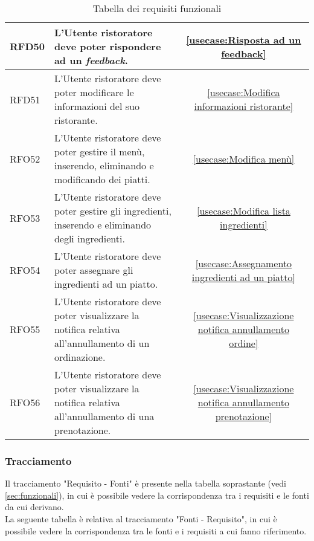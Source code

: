 \begin{table}[H]
\begin{tabularx}{\textwidth}{l|X|c}
		\hline
		RFD50       & L'Utente ristoratore deve poter rispondere ad un \textit{feedback}.                                                              & \autoref{usecase:Risposta ad un feedback}            \\
		\hline
		RFD51       & L'Utente ristoratore deve poter modificare le informazioni del suo ristorante.                                          & \autoref{usecase:Modifica informazioni ristorante}   \\
		\hline
		RFO52       & L'Utente ristoratore deve poter gestire il menù, inserendo, eliminando e modificando dei piatti.                        & \autoref{usecase:Modifica menù}                      \\
		\hline
		RFO53       & L'Utente ristoratore deve poter gestire gli ingredienti, inserendo e eliminando degli ingredienti.                      & \autoref{usecase:Modifica lista ingredienti}         \\
		\hline
		RFO54       & L'Utente ristoratore deve poter assegnare gli ingredienti ad un piatto.                      							  & \autoref{usecase:Assegnamento ingredienti ad un piatto}         \\
		\hline
		RFO55       & L'Utente ristoratore deve poter visualizzare la notifica relativa all'annullamento di un ordinazione.                   & \autoref{usecase:Visualizzazione notifica annullamento ordine}         \\
		\hline
		RFO56       & L'Utente ristoratore deve poter visualizzare la notifica relativa all'annullamento di una prenotazione.                  & \autoref{usecase:Visualizzazione notifica annullamento prenotazione}         \\
	\end{tabularx}
	\caption{Tabella dei requisiti funzionali}
\end{table}

\newpage
\subsubsection{Tracciamento}
Il tracciamento "Requisito - Fonti" è presente nella tabella soprastante (vedi \autoref{sec:funzionali}), in cui è possibile vedere la corrispondenza tra i requisiti e le fonti da cui derivano.\\ 
La seguente tabella è relativa al tracciamento "Fonti - Requisito", in cui è possibile vedere la corrispondenza tra le fonti e i requisiti a cui fanno riferimento.\\

